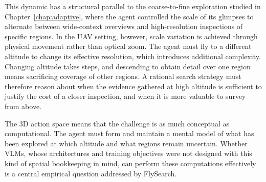 This dynamic has a structural parallel to the coarse-to-fine exploration studied in Chapter~\ref{chap:adaptive}, where the agent controlled the scale of its glimpses to alternate between wide-context overviews and high-resolution inspections of specific regions. In the UAV setting, however, scale variation is achieved through physical movement rather than optical zoom. The agent must fly to a different altitude to change its effective resolution, which introduces additional complexity. Changing altitude takes steps, and descending to obtain detail over one region means sacrificing coverage of other regions. A rational search strategy must therefore reason about when the evidence gathered at high altitude is sufficient to justify the cost of a closer inspection, and when it is more valuable to survey from above.

The 3D action space means that the challenge is as much conceptual as computational. The agent must form and maintain a mental model of what has been explored at which altitude and what regions remain uncertain. Whether VLMs, whose architectures and training objectives were not designed with this kind of spatial bookkeeping in mind, can perform these computations effectively is a central empirical question addressed by FlySearch.
